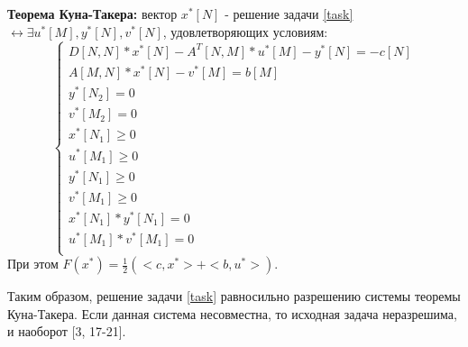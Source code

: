 \documentclass[main.tex]{subfiles}
\begin{document}
\textbf{Теорема Куна-Такера:} вектор $x^*[N]$ - решение задачи \eqref{task} $\leftrightarrow \exists u^*[M],y^*[N],v^*[N]$, удовлетворяющих условиям:
\begin{equation}
    \left\{
    \begin{array}{ll}
        D[N,N]*x^*[N]-A^T[N,M]*u^*[M]-y^*[N]=-c[N]\\
        A[M,N]*x^*[N]-v^*[M]=b[M]\\
        y^*[N_2]=0\\
        v^*[M_2]=0\\
        x^*[N_1]\geq0\\
        u^*[M_1]\geq0\\
        y^*[N_1]\geq0\\
        v^*[M_1]\geq0\\
        x^*[N_1]*y^*[N_1]=0\\
        u^*[M_1]*v^*[M_1]=0\\
    \end{array}
    \right.
\end{equation}
При этом $F(x^*)=\frac{1}{2}(<c,x^*>+<b,u^*>)$.

Таким образом, решение задачи \eqref{task} равносильно разрешению системы теоремы Куна-Такера. Если данная система несовместна, то исходная задача неразрешима, и наоборот [3, 17-21].
\end{document}

